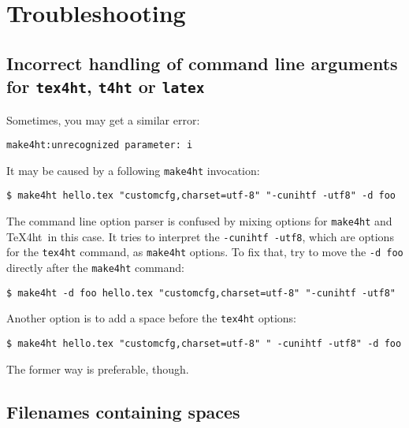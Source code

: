 \hypertarget{troubleshooting}{%
\section{Troubleshooting}\label{troubleshooting}}

\hypertarget{incorrect-handling-of-command-line-arguments-for-tex4ht-t4ht-or-latex}{%
\subsection{\texorpdfstring{Incorrect handling of command line arguments
for \texttt{tex4ht}, \texttt{t4ht} or
\texttt{latex}}{Incorrect handling of command line arguments for tex4ht, t4ht or latex}}\label{incorrect-handling-of-command-line-arguments-for-tex4ht-t4ht-or-latex}}

Sometimes, you may get a similar error:

\begin{verbatim}
make4ht:unrecognized parameter: i
\end{verbatim}

It may be caused by a following \texttt{make4ht} invocation:

\begin{verbatim}
$ make4ht hello.tex "customcfg,charset=utf-8" "-cunihtf -utf8" -d foo
\end{verbatim}

The command line option parser is confused by mixing options for
\texttt{make4ht} and \TeX4ht~in this case. It tries to interpret the
\texttt{-cunihtf\ -utf8}, which are options for the \texttt{tex4ht}
command, as \texttt{make4ht} options. To fix that, try to move the
\texttt{-d\ foo} directly after the \texttt{make4ht} command:

\begin{verbatim}
$ make4ht -d foo hello.tex "customcfg,charset=utf-8" "-cunihtf -utf8"
\end{verbatim}

Another option is to add a space before the \texttt{tex4ht} options:

\begin{verbatim}
$ make4ht hello.tex "customcfg,charset=utf-8" " -cunihtf -utf8" -d foo
\end{verbatim}

The former way is preferable, though.

\hypertarget{filenames-containing-spaces}{%
\subsection{Filenames containing
spaces}\label{filenames-containing-spaces}}

